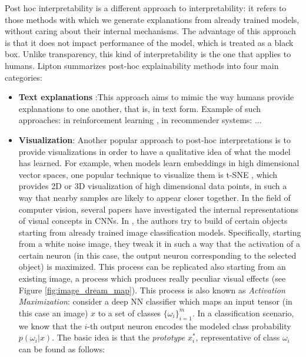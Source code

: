 Post hoc interpretability is a different approach to interpretability: it refers to those methods with which we generate explanations from already trained models, without caring about their internal mechanisms. The advantage of this approach is that it does not impact performance of the model, which is treated as a black box. Unlike transparency, this kind of interpretability is the one that applies to humans.
Lipton \cite{lipton2017mythos} summarizes post-hoc explainability  methods into four main categories:
\begin{itemize}
	\item \textbf{Text explanations} :This approach aims to mimic the way humans provide explanations to one another, that is, in text form. Example of such approaches: in reinforcement learning \cite{krening2017leaning}, in recommender systems: \cite{mcauley2013hidden}...
	\item \textbf{Visualization}: Another popular approach to post-hoc interpretations is to provide visualizations in order to have a qualitative idea of what the model has learned. For example, when models learn embeddings in high dimensional vector spaces, one popular technique to visualize them is t-SNE \cite{laurens2008tsne}, which provides 2D or 3D visualization of high dimensional data points, in such a way that nearby samples are likely to appear closer together. In the field of computer vision, several papers have investigated the internal representations of visual concepts in CNNs. In \cite{mordvintsev2015inceptionism}, the authors try to build  of certain objects starting from already trained image classification models. Specifically, starting from a white noise image, they tweak it in such a way that the activation of a certain neuron (in this case, the output neuron corresponding to the selected object) is maximized. This process can be replicated also starting from an existing image, a process which produces really peculiar visual effects (see Figure \ref{fig:image_dream_map}). This process is also known as \textit{Activation Maximization}: consider a deep NN classifier which maps an input tensor (in this case an image) $x$ to a set of classes $\{\omega_i\}_{i=1}^m$. In a classification scenario, we know that the $i$-th output neuron encodes the modeled class probability $p\left(\omega_i|x\right)$. The basic idea is that the \textit{prototype} $x_i^*$, representative of class $\omega_i$ can be found as follows:
	

\end{itemize}
